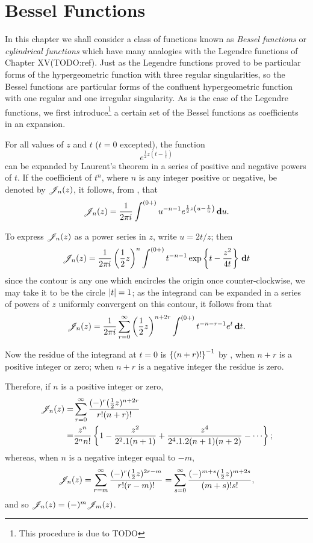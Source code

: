 %
%
\chapter{Bessel Functions}
In this chapter we shall consider a class of functions known as  \emph{Bessel functions}
or \emph{cylindrical functions}
which have many analogies with the Legendre functions of  Chapter XV(TODO:ref).
Just as the Legendre functions proved to be particular forms of the
hypergeometric function with three regular singularities,  so the
Bessel functions are particular forms of the  confluent
hypergeometric function with one regular and one irregular
singularity. As is the case of the Legendre functions, we first
introduce\footnote{This procedure is due to TODO \Schlomilch}
a certain set of the Bessel functions as coefficients in an
expansion.

For all values of $z$ and $t$ ($t=0$ excepted), the function
$$
e^{ \frac{1}{2} z \left( t - \frac{1}{t} \right)}
$$
can be expanded by Laurent's theorem in a series of positive and
negative powers of $t$. If the coefficient of $t^{n}$, where $n$ is any
integer positive or negative, be denoted by
$\mathscr{J}_{n}(z)$, it follows, from
, that
$$
\mathscr{J}_{n}(z) = \frac{1}{2\pi i} \int^{(0+)} u^{-n-1} e^{\frac{1}{2} z \left( u
    - \frac{1}{u} \right)} \, \mathbf{d} u.
$$

To express $\mathscr{J}_{n}(z)$ as a power series in $z$, write $u = 2t/z$; then
$$
\mathscr{J}_{n}(z) = \frac{1}{2\pi i} \left( \frac{1}{2} z  \right)^{n} \int^{(0+)} t^{-n-1}
\exp \left\{  t - \frac{z^{2}}{4t}   \right\} \, \mathbf{d} t
$$
since the contour is any one which encircles the origin once
counter-clockwise, we may take it to be the circle
$\left| t \right|=1$; as the integrand can be expanded in a series of powers
of $z$ uniformly convergent on this contour, it follows from
 that
$$
\mathscr{J}_{n}(z)
=
\frac{1}{2\pi i}
\sum_{r=0}^{\infty} \left( \frac{1}{2} z \right)^{n+2r}
\int^{(0+)} t^{-n-r-1} e^{t} \, \mathbf{d} t.
$$

Now the residue of the integrand at $t=0$ is
$\left\{  (n+r)!   \right\}^{-1}$ by
, when $n+r$ is a positive
integer or zero; when $n+r$ is a negative integer
the residue is zero.

Therefore, if $n$ is a positive integer or zero,
\begin{align*}
  \besJ_{n}(z) =& \sum_{r=0}^{\infty} \frac{ (-)^{r} (\half z)^{n+2r} }{
    r!(n+r)! } \\
  =& \frac{ z^{n} }{ 2^{n} n! }
  \thebrace{ 1 - \frac{z^{2}}{2^{2}.1(n+1)} + \frac{z^{4}}{2^{4}.1.2(n+1)(n+2)}
    - \cdots };
\end{align*}
%
%
whereas, when $n$ is a negative integer equal to $-m$,
$$
\mathscr{J}_{n}(z)
= \sum_{r=m}^{\infty} \frac{ (-)^{r} (\frac{1}{2} z)^{2r-m} }{ r!(r-m)!  }
= \sum_{s=0}^{\infty} \frac{ (-)^{m+s} (\frac{1}{2} z)^{m+2s}  }{ (m+s)! s!  },
$$
and so $\mathscr{J}_{n}(z) = (-)^{m} \mathscr{J}_{m}(z)$.

